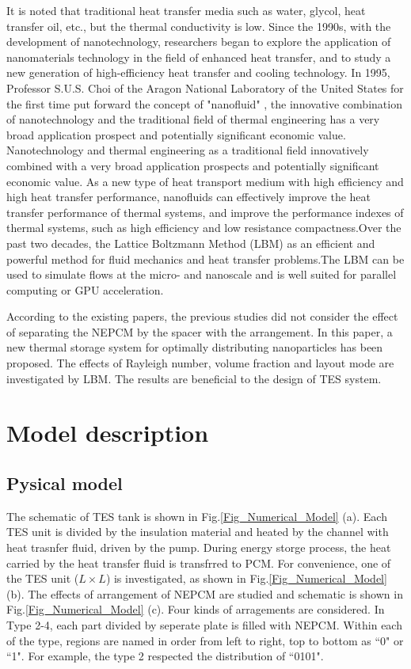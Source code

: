 \documentclass[preprint,12pt]{elsarticle}
\begin{document}
It is noted that traditional heat transfer media such as water, glycol, heat transfer oil, etc., but the thermal conductivity is low. Since the 1990s, with the development of nanotechnology, researchers began to explore the application of nanomaterials technology in the field of enhanced heat transfer, and to study a new generation of high-efficiency heat transfer and cooling technology. In 1995, Professor S.U.S. Choi of the Aragon National Laboratory of the United States for the first time put forward the concept of "nanofluid" \cite{1995Developments}, the innovative combination of nanotechnology and the traditional field of thermal engineering has a very broad application prospect and potentially significant economic value. Nanotechnology and thermal engineering as a traditional field innovatively combined with a very broad application prospects and potentially significant economic value. As a new type of heat transport medium with high efficiency and high heat transfer performance, nanofluids can effectively improve the heat transfer performance of thermal systems, and improve the performance indexes of thermal systems, such as high efficiency and low resistance compactness.Over the past two decades, the Lattice Boltzmann Method (LBM) as an efficient and powerful method for fluid mechanics and heat transfer problems.The LBM can be used to simulate flows at the micro- and nanoscale and is well suited for parallel computing or GPU acceleration\cite{Chen2018MultiGPUST}.

According to the existing papers, the previous studies did not consider the effect of separating the NEPCM by the spacer with the arrangement. In this paper, a new thermal storage system for optimally distributing nanoparticles has been proposed. The effects of Rayleigh number, volume fraction and layout mode are investigated by LBM. The results are beneficial to the design of TES system. 

\section{Model description}
\subsection{Pysical model}
The schematic of TES tank is shown in Fig.\ref{Fig_Numerical_Model} (a). Each TES unit is divided by the insulation material and heated by the channel with heat trasnfer fluid, driven by the pump. During energy storge process, the heat carried by the heat transfer fluid is transfrred to PCM. For convenience, one of the TES unit ($L\times L$) is investigated, as shown in Fig.\ref{Fig_Numerical_Model} (b). The effects of arrangement of NEPCM are studied and schematic is shown in Fig.\ref{Fig_Numerical_Model} (c). Four kinds of arragements are considered. In Type 2-4, each part divided by seperate plate is filled with NEPCM. 
Within each of the type, regions are named in order from left to right, top to bottom as ``0" or ``1". For example, the type 2 respected the distribution of ``0101".
\end{document}
